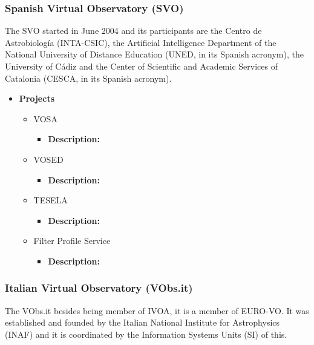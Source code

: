 \subsubsection{Spanish Virtual Observatory (SVO)}
The SVO started in June 2004 and its participants are the Centro de
Astrobiolog\'{i}a (INTA-CSIC), the Artificial Intelligence Department of the
National University of Distance Education (UNED, in its Spanish acronym), the
University of C\'{a}diz and the Center of Scientific and Academic Services of
Catalonia (CESCA, in its Spanish acronym).

\begin{itemize}
\item \textbf{Projects}
\begin{itemize}
\item VOSA
\begin{itemize}
\item \textbf{Description:}
\end{itemize}
\item VOSED
\begin{itemize}
\item \textbf{Description:}
\end{itemize}
\item TESELA
\begin{itemize}
\item \textbf{Description:}
\end{itemize}
\item Filter Profile Service
\begin{itemize}
\item \textbf{Description:}
\end{itemize}
\end{itemize}
\end{itemize}

\subsubsection{Italian Virtual Observatory (VObs.it)}
The VObs.it besides being member of IVOA, it is a member of EURO-VO. It was
established and founded by the Italian National Institute for Astrophysics
(INAF) and it is coordinated by the Information Systems Units (SI) of this. 

